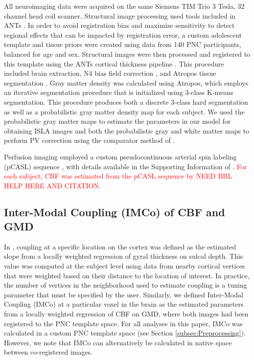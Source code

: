 \documentclass[review]{elsarticle}
\begin{document}
All neuroimaging data were acquired on the same Siemens TIM Trio 3 Tesla, 32 channel head coil scanner. Structural image processing used tools included in ANTs \citep{avants2009advanced}. In order to avoid registration bias and maximize sensitivity to detect regional effects that can be impacted by registration error, a custom adolescent template and tissue priors were created using data from 140 PNC participants, balanced for age and sex. Structural images were then processed and registered to this template using the ANTs cortical thickness pipeline \citep{tustison2014large}. This procedure included brain extraction, N4 bias field correction \citep{tustison2010n4itk}, and Atropos tissue segmentation \citep{avants2011open}. Gray matter density was calculated using Atropos, which employs an iterative segmentation procedure that is initialized using 3-class K-means segmentation. This procedure produces both a discrete 3-class hard segmentation as well as a probabilistic gray matter density map for each subject. We used the probabilistic gray matter maps to estimate the parameters in our model for obtaining ISLA images and both the probabilistic gray and white matter maps to perform PV correction using the comparator method of \citep{ahlgren2014partial}.

Perfusion imaging employed a custom pseudocontinuous arterial spin labeling (pCASL) sequence \citep{Wu+etal:07}, with details available in the Supporting Information of \citep{Sat+Shi+etal:14}. \textcolor{red}{For each subject, CBF was estimated from the pCASL sequence by NEED BBL HELP HERE AND CITATION.} 

\subsection{Inter-Modal Coupling (IMCo) of CBF and GMD}
\label{subsec:IMCo}

In \citep{Van+etal:16}, coupling at a specific location on the cortex was defined as the estimated slope from a locally weighted regression of gyral thickness on sulcal depth. This value was computed at the subject level using data from nearby cortical vertices that were weighted based on their distance to the location of interest. In practice, the number of vertices in the neighborhood used to estimate coupling is a tuning parameter that must be specified by the user. Similarly, we defined Inter-Modal Coupling (IMCo) at a particular voxel in the brain as the estimated parameters from a locally weighted regression of CBF on GMD, where both images had been registered to the PNC template space. For all analyses in this paper, IMCo was calculated in a custom PNC template space (see Section \ref{subsec:Preprocessing}). However, we note that IMCo can alternatively be calculated in native space between co-registered images.  
\end{document}

